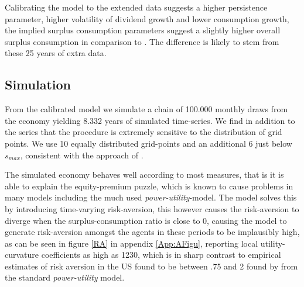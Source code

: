 Calibrating the model to the extended data suggests a higher persistence parameter, higher volatility of dividend growth and lower consumption growth, the implied surplus consumption parameters suggest a slightly higher overall surplus consumption in comparison to \cite{Campbell1999}. The difference is likely to stem from these 25 years of extra data. 

\subsection{Simulation}
From the calibrated model we simulate a chain of 100.000 monthly draws from the economy yielding 8.332 years of simulated time-series. We find in addition to the series that the procedure is extremely sensitive to the distribution of grid points. We use 10 equally distributed grid-points and an additional 6 just below $s_{max}$, consistent with the approach of \citet{Campbell1999}.


The simulated economy behaves well according to most measures, that is it is able to explain the equity-premium puzzle, which is known to cause problems in many models including the much used \textit{power-utility}-model. The \citet{Campbell1999} model solves this by introducing time-varying risk-aversion, this however causes the risk-aversion to diverge when the surplus-consumption ratio is close to 0, causing the model to generate risk-aversion amongst the agents in these periods to be implausibly high, as can be seen in figure \ref{RA} in appendix \ref{App:AFigu}, reporting local utility-curvature coefficients as high as 1230, which is in sharp contrast to empirical estimates of risk aversion in the US found to be between .75 and 2 found by \citet{SLFred2015} from the standard \textit{power-utility} model.




